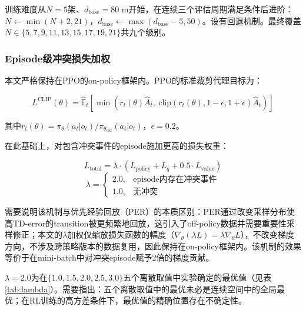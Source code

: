 \documentclass[12pt,a4paper,UTF8]{ctexart}
\begin{document}
训练难度从$N=5$架、$d_{\text{base}}=80$ m开始，在连续三个评估周期满足条件后进阶：$N \leftarrow \min(N+2, 21)$，$d_{\text{base}} \leftarrow \max(d_{\text{base}}-5, 50)$。设有回退机制。最终覆盖$N \in \{5,7,9,11,13,15,17,19,21\}$共九个级别。

\subsubsection{Episode级冲突损失加权}

本文严格保持在PPO的on-policy框架内。PPO的标准裁剪代理目标为：

\begin{equation}
    L^{\text{CLIP}}(\theta) = \hat{\mathbb{E}}_t\left[\min\left(r_t(\theta)\hat{A}_t,\ \text{clip}(r_t(\theta), 1-\epsilon, 1+\epsilon)\hat{A}_t\right)\right]
\end{equation}

其中$r_t(\theta) = \pi_\theta(a_t|o_t) / \pi_{\theta_{\text{old}}}(a_t|o_t)$，$\epsilon = 0.2$。

在此基础上，对包含冲突事件的episode施加更高的损失权重：

\begin{equation}
    L_{\text{total}} = \lambda \cdot (L_{\text{policy}} + L_q + 0.5 \cdot L_{\text{value}})
\end{equation}
\begin{equation}
    \lambda = \begin{cases}
        2.0, & \text{episode内存在冲突事件} \\
        1.0, & \text{无冲突}
    \end{cases}
\end{equation}

需要说明该机制与优先经验回放（PER）的本质区别：PER通过改变采样分布使高TD-error的transition被更频繁地回放，这引入了off-policy数据并需要重要性采样修正；本文的$\lambda$加权仅缩放损失函数的幅度（$\nabla_\theta(\lambda L) = \lambda\nabla_\theta L$），不改变梯度方向，不涉及跨策略版本的数据复用，因此保持在on-policy框架内。该机制的效果等价于在mini-batch中对冲突episode赋予2倍的梯度贡献。

$\lambda=2.0$为在$\{1.0, 1.5, 2.0, 2.5, 3.0\}$五个离散取值中实验确定的最优值（见表\ref{tab:lambda}）。需要指出：五个离散取值中的最优未必是连续空间中的全局最优；在RL训练的高方差条件下，最优值的精确位置存在不确定性。
\end{document}
